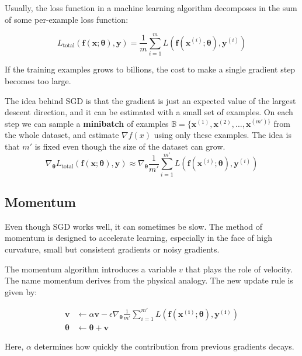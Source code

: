 Usually, the loss function in a machine learning algorithm decomposes in the sum of some per-example loss function:

\begin{equation}
L_{\text{total}}\left(\bm{f}(\bm{x};\bm{\theta}),\bm{y}\right) = \frac{1}{m}\sum_{i=1}^m L\left(\bm{f}(\bm{x}^{(i)};\bm{\theta}),\bm{y}^{(i)}\right)
\end{equation}

 If the training examples grows to billions, the cost to make a single gradient step becomes too large.

The idea behind SGD is that the gradient is just an expected value of the largest descent direction, and it can be estimated with a small set of examples. On each step we can sample a \textbf{minibatch} of examples \(\mathbb{B}=\{\bm{x}^{(1)}, \bm{x}^{(2)}, \ldots,  \bm{x}^{(m')\}}\) from the whole dataset, and estimate \(\nabla f(x)\) using only these examples. The idea is that \(m'\) is fixed even though the size of the dataset can grow.
\begin{equation}
\nabla_{\bm{\theta}}L_{\text{total}}\left(\bm{f}(\bm{x};\bm{\theta}),\bm{y}\right) \approx \nabla_{\bm{\theta}}\frac{1}{m'}\sum_{i=1}^{m'} L\left(\bm{f}(\bm{x}^{(i)};\bm{\theta}),\bm{y}^{(i)}\right)
\end{equation}

\subsection{Momentum}

Even though SGD works well, it can sometimes be slow. The method of momentum is designed to accelerate learning, especially in the face of high curvature, small but consistent gradients or noisy gradients.

The momentum algorithm introduces a variable \(v\) that plays the role of velocity. The name momentum derives from the physical analogy. The new update rule is given by:

\begin{align}
\bm{v} &\leftarrow \alpha \bm{v} - \epsilon \nabla_{\bm{\theta}}\frac{1}{m'}\sum_{i=1}^{m'} L\left(\bm{f}(\bm{x^{(i)}};\bm{\theta}),\bm{y^{(i)}}\right)\\
\bm{\theta} &\leftarrow \bm{\theta} + \bm{v}
\end{align}

Here, \(\alpha\) determines how quickly the contribution from previous gradients decays.


